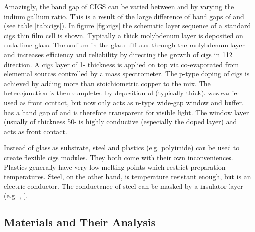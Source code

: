 
Amazingly, the band gap of CIGS can be varied between  and  by varying the indium gallium ratio.
This is a result of the large difference of band gaps of  and  (see table \ref{tab:cigs}). 
In figure \ref{fig:cigs} the schematic layer sequence of a standard \gls{cigs} thin film cell is shown. 
Typically a  thick molybdenum layer is deposited on soda lime glass. 
The sodium in the glass diffuses through the molybdenum layer and increases efficiency and reliability by directing the growth of \gls{cigs} in 112 direction\cite{hedstrom1993cigs}.
A \gls{cigs} layer of 1- thickness is applied on top via co-evaporated from elemental sources controlled by a mass spectrometer.\cite{hedstrom1993cigs}
The p-type doping of \gls{cigs} is achieved by adding more than stoichiometric copper to the mix. 
The heterojunction is then completed by deposition of  (typically  thick).
 was earlier used as front contact, but now only acts as n-type wide-gap window and buffer. 
 has a band gap of  and is therefore transparent for visible light. 
The  window layer (usually of thickness 50- is highly conductive (especially the  doped layer) and acts as front contact. 

%
Instead of glass as substrate, steel and plastics (e.g. polyimide\cite{feurer2017cigs}) can be used to create flexible \gls{cigs} modules. 
They both come with their own inconveniences. 
Plastics generally have very low melting points which restrict preparation temperatures.
Steel, on the other hand, is temperature resistant enough, but is an electric conductor. 
The conductance of steel can be masked by a insulator layer (e.g. , ).

\subsection{Materials and Their Analysis}
